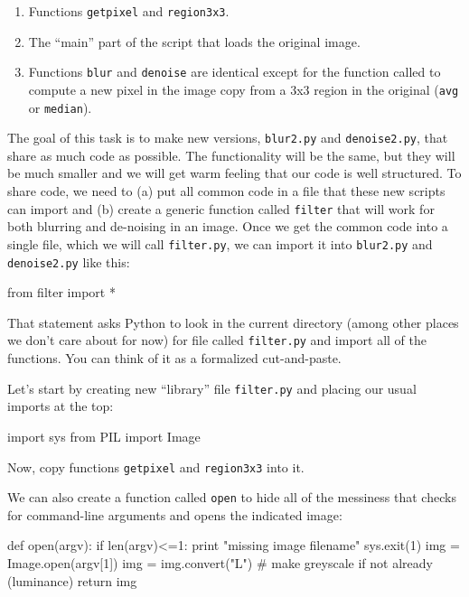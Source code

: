\documentclass[titlepage]{tufte-book}
\begin{document}
\begin{enumerate}
\item Functions {\tt getpixel} and {\tt region3x3}.
\item The ``main'' part of the script that loads the original image.
\item Functions {\tt blur} and {\tt denoise} are identical except for the function called to compute a new pixel in the image copy from a 3x3 region in the original ({\tt avg} or {\tt median}).
\end{enumerate}

The goal of this task is to make new versions, {\tt blur2.py} and {\tt denoise2.py}, that share as much code as possible.  The functionality will be the same, but they will be much smaller and we will get warm feeling that our code is well structured. To share code, we need to (a) put all common code in a file that these new scripts can import and (b) create a generic function called {\tt filter} that will work for both blurring and de-noising in an image. Once we get the common code into a single file, which we will call {\tt filter.py}, we can import it into {\tt blur2.py} and {\tt denoise2.py} like this:
 
\begin{pyverbatim}
from filter import *
\end{pyverbatim}

\noindent That statement asks Python to look in the current directory (among other places we don't care about for now) for file called {\tt filter.py} and import all of the functions. You can think of it as a formalized cut-and-paste.

Let's start by creating new ``library'' file {\tt filter.py} and placing our usual imports at the top:

\begin{pyverbatim}
import sys
from PIL import Image
\end{pyverbatim}

\noindent Now, copy functions {\tt getpixel} and {\tt region3x3} into it.

We can also create a function called {\tt open} to hide all of the messiness that checks for command-line arguments and opens the indicated image:

\begin{pyverbatim}
def open(argv):
	if len(argv)<=1:
		print "missing image filename"
		sys.exit(1)
	img = Image.open(argv[1])
	img = img.convert("L")  # make greyscale if not already (luminance)
	return img
\end{pyverbatim}
\end{document}
